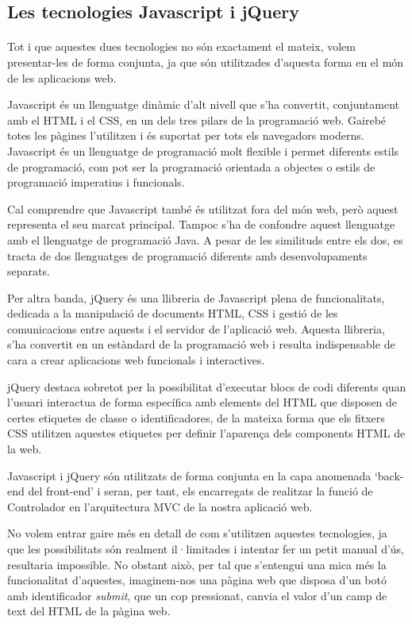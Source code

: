 \subsection{Les tecnologies Javascript i jQuery}

    \paragraph{}
    Tot i que aquestes dues tecnologies no són exactament el mateix, volem presentar-les de forma conjunta, ja que són utilitzades d’aquesta forma en el món de les aplicacions web.

    Javascript és un llenguatge dinàmic d'alt nivell que s'ha convertit, conjuntament amb el HTML i el CSS, en un dels tres pilars de la programació web. Gairebé totes les pàgines l'utilitzen i és suportat per tots els navegadors moderns. Javascript és un llenguatge de programació molt flexible i permet diferents estils de programació, com pot ser la programació orientada a objectes o estils de programació imperatius i funcionals.

    Cal comprendre que Javascript també és utilitzat fora del món web, però aquest  representa el seu marcat principal. Tampoc s'ha de confondre aquest llenguatge amb el llenguatge de programació Java. A pesar de les similituds entre els dos, es tracta de dos llenguatges de programació diferents amb desenvolupaments separats.

    Per altra banda, jQuery és una llibreria de Javascript plena de funcionalitats, dedicada a la manipulació de documents HTML, CSS i gestió de les comunicacions entre aquests i el servidor de l’aplicació web. Aquesta llibreria, s'ha convertit en un estàndard de la programació web i resulta indispensable de cara a crear aplicacions web funcionals i interactives.

    jQuery destaca sobretot per la possibilitat d’executar blocs de codi diferents quan l’usuari interactua de forma específica amb elements del HTML que disposen de certes etiquetes de classe o identificadores, de la mateixa forma que els fitxers CSS utilitzen aquestes etiquetes per definir l’aparença dels components HTML de la web.

    Javascript i jQuery són utilitzats de forma conjunta en la capa anomenada `back-end del front-end’ i seran, per tant, els encarregats de realitzar la funció de Controlador en l'arquitectura MVC de la nostra aplicació web.

    No volem entrar gaire més en detall de com s’utilitzen aquestes tecnologies, ja que les possibilitats són realment il·limitades i intentar fer un petit manual d’ús, resultaria impossible. No obstant això, per tal que s'entengui una mica més la funcionalitat d'aquestes, imaginem-nos una pàgina web que disposa d'un botó amb identificador \emph{submit}, que un cop pressionat, canvia el valor d'un camp de text del HTML de la pàgina web.

